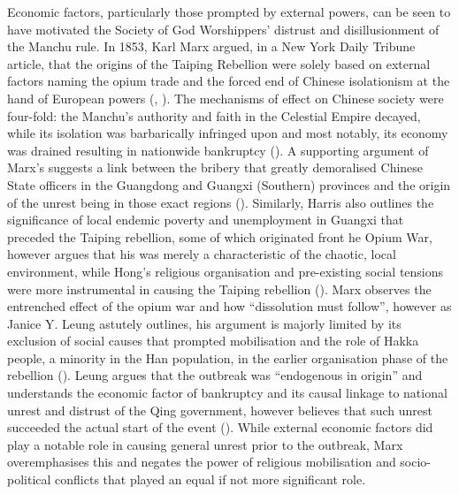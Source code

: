 Economic factors, particularly those prompted by external powers, can be seen to have motivated the Society of God Worshippers’ distrust and disillusionment of the Manchu rule. In 1853, Karl Marx argued, in a New York Daily Tribune article, that the origins of the Taiping Rebellion were solely based on external factors naming the opium trade and the forced end of Chinese isolationism at the hand of European powers (\cite{KarlMarxNew}, \cite{leungCritiqueMarxsView2013}). The mechanisms of effect on Chinese society were four-fold: the Manchu’s authority and faith in the Celestial Empire decayed, while its isolation was barbarically infringed upon and most notably, its economy was drained resulting in nationwide bankruptcy (\cite{KarlMarxNew}). A supporting argument of Marx’s suggests a link between the bribery that greatly demoralised Chinese State officers in the Guangdong and Guangxi (Southern) provinces and the origin of the unrest being in those exact regions (\cite{KarlMarxNew}). Similarly, Harris also outlines the significance of local endemic poverty and unemployment in Guangxi that preceded the Taiping rebellion, some of which originated front he Opium War, however argues that his was merely a characteristic of the chaotic, local environment, while Hong’s religious organisation and pre-existing social tensions were more instrumental in causing the Taiping rebellion (\cite{zotero-item-121}). Marx observes the entrenched effect of the opium war and how “dissolution must follow”, however as Janice Y. Leung astutely outlines, his argument is majorly limited by its exclusion of social causes that prompted mobilisation and the role of Hakka people, a minority in the Han population, in the earlier organisation phase of the rebellion (\cite{leungCritiqueMarxsView2013}). Leung argues that the outbreak was “endogenous in origin” and understands the economic factor of bankruptcy and its causal linkage to national unrest and distrust of the Qing government, however believes that such unrest succeeded the actual start of the event (\cite{leungCritiqueMarxsView2013}). While external economic factors did play a notable role in causing general unrest prior to the outbreak, Marx overemphasises this and negates the power of religious mobilisation and socio-political conflicts that played an equal if not more significant role. \\


